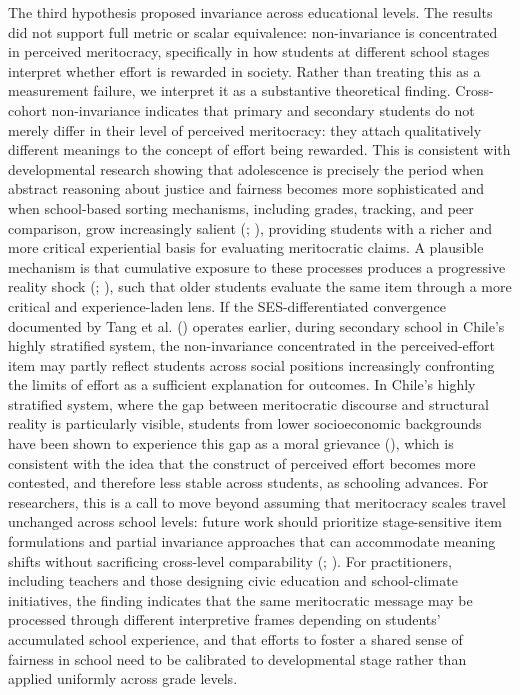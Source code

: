 \documentclass[
  13pt,
]{article}
\begin{document}
The third hypothesis proposed invariance across educational levels. The
results did not support full metric or scalar equivalence:
non-invariance is concentrated in perceived meritocracy, specifically in
how students at different school stages interpret whether effort is
rewarded in society. Rather than treating this as a measurement failure,
we interpret it as a substantive theoretical finding. Cross-cohort
non-invariance indicates that primary and secondary students do not
merely differ in their level of perceived meritocracy: they attach
qualitatively different meanings to the concept of effort being
rewarded. This is consistent with developmental research showing that
adolescence is precisely the period when abstract reasoning about
justice and fairness becomes more sophisticated and when school-based
sorting mechanisms, including grades, tracking, and peer comparison,
grow increasingly salient (; ),
providing students with a richer and more critical experiential basis
for evaluating meritocratic claims. A plausible mechanism is that
cumulative exposure to these processes produces a progressive reality
shock (;
), such that
older students evaluate the same item through a more critical and
experience-laden lens. If the SES-differentiated convergence documented
by Tang et al. () operates
earlier, during secondary school in Chile's highly stratified system,
the non-invariance concentrated in the perceived-effort item may partly
reflect students across social positions increasingly confronting the
limits of effort as a sufficient explanation for outcomes. In Chile's
highly stratified system, where the gap between meritocratic discourse
and structural reality is particularly visible, students from lower
socioeconomic backgrounds have been shown to experience this gap as a
moral grievance (), which is consistent with the idea that the
construct of perceived effort becomes more contested, and therefore less
stable across students, as schooling advances. For researchers, this is
a call to move beyond assuming that meritocracy scales travel unchanged
across school levels: future work should prioritize stage-sensitive item
formulations and partial invariance approaches that can accommodate
meaning shifts without sacrificing cross-level comparability
(;
).
For practitioners, including teachers and those designing civic
education and school-climate initiatives, the finding indicates that the
same meritocratic message may be processed through different
interpretive frames depending on students' accumulated school
experience, and that efforts to foster a shared sense of fairness in
school need to be calibrated to developmental stage rather than applied
uniformly across grade levels.
\end{document}

